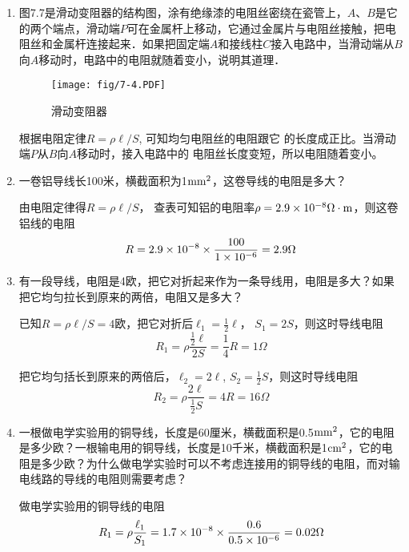 \begin{enumerate}
    \item 图7.7是滑动变阻器的结构图，涂有绝缘漆的电阻丝密绕在瓷管上，$A$、$B$是它的两个端点，滑动端$P$可在金属杆上移动，它通过金属片与电阻丝接触，把电阻丝和金属杆连接起来．如果把固定端$A$和接线柱$C$接入电路中，当滑动端从$B$向$A$移动时，电路中的电阻就随着变小，说明其道理．
    \begin{figure}[htp]\centering
       \texttt{[image: fig/7-4.PDF]}
        \caption{滑动变阻器}
        \end{figure}

\begin{solution}
    根据电阻定律$R=\rho\ell/S$,
    可知均匀电阻丝的电阻跟它
    的长度成正比。当滑动端$P$从$B$向$A$移动时，接入电路中的
    电阻丝长度变短，所以电阻随着变小。
\end{solution}

    \item 一卷铝导线长100米，横截面积为1${\rm mm}^2$，这卷导线的电阻是多大？

    \begin{solution}
        由电阻定律得$R=\rho\ell/S$，
        查表可知铝的电阻率$\rho=
        2.9\times10^{-8}\Omega\cdot {\rm m}$，则这卷铝线的电阻
\[R=2.9\times 10^{-8}\times\frac{100}{1\times 10^{-6}}=2.9\Omega\]
    \end{solution}
    
    \item 有一段导线，电阻是4欧，把它对折起来作为一条导线用，电阻是多大？如果把它均匀拉长到原来的两倍，电阻又是多大？

    \begin{solution}
已知$R=\rho\ell/S=4$欧，把它对折后$\ell_1=\frac{1}{2}\ell$，
$S_1=2S$，则这时导线电阻
\[R_1=\rho\frac{\frac{1}{2}\ell}{2S}=\frac{1}{4}R=1\Omega\]

把它均匀括长到原来的两倍后，$\ell_2=2\ell$, $S_2=\frac{1}{2}S$，则这时导线电阻
\[R_2=\rho\frac{2\ell}{\frac{1}{2}S}={4}R=16\Omega\]
    \end{solution}
    
    \item 一根做电学实验用的铜导线，长度是60厘米，横截面积是0.5${\rm mm}^2$，它的电阻是多少欧？一根输电用的铜导线，长度是10千米，横截面积是1${\rm cm}^2$，它的电阻是多少欧？为什么做电学实验时可以不考虑连接用的铜导线的电阻，而对输电线路的导线的电阻则需要考虑？

    \begin{solution}
做电学实验用的铜导线的电阻
\[R_1=\rho\frac{\ell_1}{S_1}=1.7\times 10^{-8}\times \frac{0.6}{0.5\times 10^{-6}}=0.02\Omega\]


\end{solution}
\end{enumerate}
